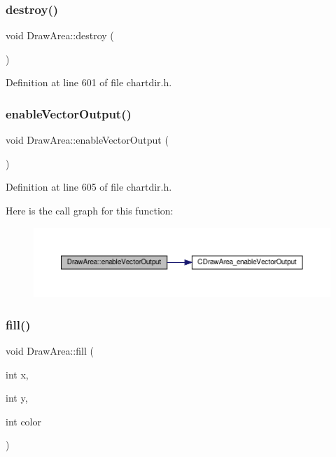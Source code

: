 \subsubsection{\texorpdfstring{destroy()}{destroy()}}
{\footnotesize\ttfamily void Draw\+Area\+::destroy (\begin{DoxyParamCaption}{ }\end{DoxyParamCaption})\hspace{0.3cm}{\ttfamily [inline]}}



Definition at line 601 of file chartdir.\+h.

\mbox{\label{class_draw_area_a8e12a528febd5954e748606552946810}} 
\subsubsection{\texorpdfstring{enable\+Vector\+Output()}{enableVectorOutput()}}
{\footnotesize\ttfamily void Draw\+Area\+::enable\+Vector\+Output (\begin{DoxyParamCaption}{ }\end{DoxyParamCaption})\hspace{0.3cm}{\ttfamily [inline]}}



Definition at line 605 of file chartdir.\+h.

Here is the call graph for this function\+:
\nopagebreak
\begin{figure}[H]
\begin{center}
\leavevmode
\includegraphics[width=350pt]{class_draw_area_a8e12a528febd5954e748606552946810_cgraph}
\end{center}
\end{figure}
\mbox{\label{class_draw_area_a4d6f312431ecd2a7d790f216a711a72f}} 
\subsubsection{\texorpdfstring{fill()}{fill()}\hspace{0.1cm}{\footnotesize\ttfamily [1/2]}}
{\footnotesize\ttfamily void Draw\+Area\+::fill (\begin{DoxyParamCaption}\item[{int}]{x,  }\item[{int}]{y,  }\item[{int}]{color }\end{DoxyParamCaption})\hspace{0.3cm}{\ttfamily [inline]}}



